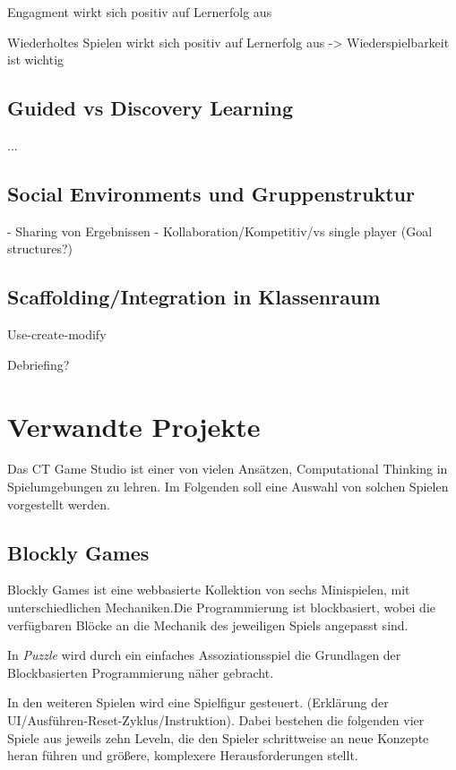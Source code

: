 Engagment wirkt sich positiv auf Lernerfolg aus

Wiederholtes Spielen wirkt sich positiv auf Lernerfolg aus -> Wiederspielbarkeit ist wichtig

\subsection{Guided vs Discovery Learning}

...

\subsection{Social Environments und Gruppenstruktur}

- Sharing von Ergebnissen
- Kollaboration/Kompetitiv/vs single player (Goal structures?)

\subsection{Scaffolding/Integration in Klassenraum}

Use-create-modify

Debriefing?


\section{Verwandte Projekte}

Das CT Game Studio ist einer von vielen Ansätzen, Computational Thinking in Spielumgebungen zu
lehren. Im Folgenden soll eine Auswahl von solchen Spielen vorgestellt werden.

\subsection{Blockly Games}

Blockly Games ist eine webbasierte Kollektion von sechs Minispielen, mit unterschiedlichen
Mechaniken.Die Programmierung ist blockbasiert, wobei die verfügbaren Blöcke an die Mechanik des
jeweiligen Spiels angepasst sind.

In \emph{Puzzle} wird durch ein einfaches Assoziationsspiel die Grundlagen der Blockbasierten
Programmierung näher gebracht.

In den weiteren Spielen wird eine Spielfigur gesteuert. (Erklärung der
UI/Ausführen-Reset-Zyklus/Instruktion). Dabei bestehen die folgenden vier Spiele aus jeweils zehn
Leveln, die den Spieler schrittweise an neue Konzepte heran führen und größere, komplexere
Herausforderungen stellt.

